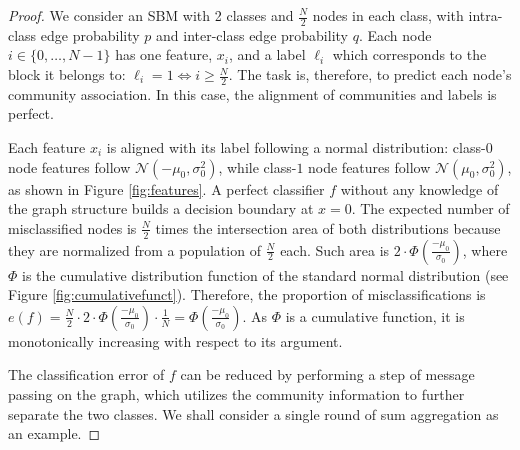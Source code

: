 \begin{proof} 
	
	We consider an SBM with 2 classes and $\frac{N}{2}$ nodes in each class, with intra-class edge probability $p$ and inter-class edge probability $q$.
	Each node $i\in\{0,\ldots,N-1\}$ has one feature, $x_i$, and a label $\ell_i$ which corresponds to the block it belongs to: $\ell_i = 1 \Leftrightarrow i \geq \frac{N}{2}$. The task is, therefore, to predict each node's community association. In this case, the alignment of communities and labels is perfect.
	
	Each feature $x_i$ is aligned with its label following a normal distribution: class-$0$ node features follow $\mathcal{N}(-\mu_0,\sigma_0^2)$, while class-$1$ node features follow $\mathcal{N}(\mu_0,\sigma_0^2)$, as shown in Figure \ref{fig:features}. 
	A perfect classifier $f$ without any knowledge of the graph structure builds a decision boundary at $x=0$. The expected number of misclassified nodes is $\frac{N}{2}$ times the intersection area of both distributions \textemdash because they are normalized from a population of $\frac{N}{2}$ each. Such area is $2 \cdot \Phi(\frac{-\mu_0}{\sigma_0})$, where $\Phi$ is the cumulative distribution function of the standard normal distribution (see Figure \ref{fig:cumulativefunct}). Therefore, the proportion of misclassifications is $e(f) = \frac{N}{2}\cdot 2\cdot \Phi(\frac{-\mu_0}{\sigma_0}) \cdot \frac{1}{N} = \Phi(\frac{-\mu_0}{\sigma_0})$. As $\Phi$ is a cumulative function, it is monotonically increasing with respect to its argument.
	
	The classification error of $f$ can be reduced by performing a step of message passing on the graph, which utilizes the community information to further separate the two classes. We shall consider a single round of sum aggregation as an example.
	

\end{proof}
